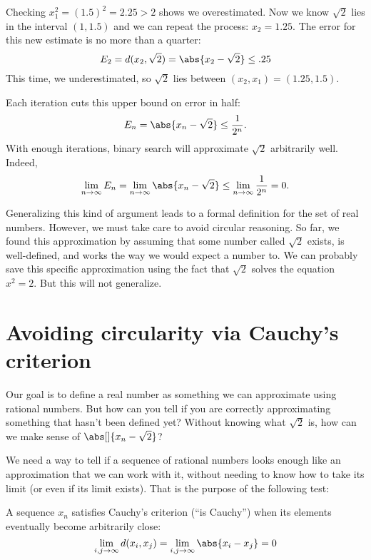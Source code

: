 \documentclass{scrartcl}
\newcommand{\dist}{d}
\begin{document}
Checking $x_{1}^{2}=(1.5)^{2} = 2.25 > 2$ shows we overestimated. Now we know $\sqrt 2$ lies in the interval $(1, 1.5)$ and we can repeat the process: $x_{2} = 1.25$. The error for this new estimate is no more than a quarter:
\[
  E_{2} = \dist(x_{2},\sqrt 2) = \abs{x_{2}-\sqrt 2} \leq .25
\]
This time, we underestimated, so $\sqrt 2$  lies between $(x_{2},x_{1})=(1.25,1.5)$.

Each iteration cuts this upper bound on error in half:
\[
  E_{n} = \abs{x_{n}-\sqrt{2}} \leq \frac{1}{2^{n}}.
\]
With enough iterations, binary search will approximate $\sqrt 2$ arbitrarily well. Indeed,
\[
  \lim_{{n\to\infty}} E_{n} = \lim_{n\to\infty} \abs{x_{n}-\sqrt 2} \leq \lim_{{n\to\infty}} \frac{1}{2^{n}} = 0.
\]

Generalizing this kind of argument leads to a formal definition for the set of real numbers. However, we must take care to avoid circular reasoning. So far, we found this approximation by assuming that some number called $\sqrt 2$ exists, is well-defined, and works the way we would expect a number to. We can probably save this specific approximation using the fact that $\sqrt 2$ solves the equation $x^{2}=2$. But this will not generalize.

\section{Avoiding circularity via Cauchy's criterion}
Our goal is to define a real number as something we can approximate using rational numbers. But how can you tell if you are correctly approximating something that hasn't been defined yet?
Without knowing what $\sqrt 2$ is, how can we make sense of $\abs[]{x_{n}-\sqrt 2}$?

We need a way to tell if a sequence of rational numbers looks enough like an approximation that we can work with it, without needing to know how to take its limit (or even if its limit exists). That is the purpose of the following test:
\begin{defn}\label{Cauchy's criterion}
  A sequence $x_{n}$ satisfies Cauchy's criterion (``is Cauchy'') when its elements eventually become arbitrarily close:
  \[
    \lim_{i,j\to\infty} d(x_{i},x_{j})=\lim_{i,j\to \infty} \abs{x_{i}-x_{j}} =0
  \]
\end{defn}
\end{document}
